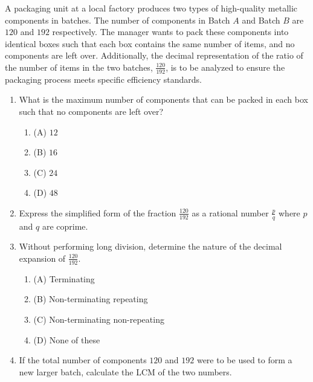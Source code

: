\documentclass[12pt,a4paper]{exam}
\begin{document}
\begin{questions}
\question[4] A packaging unit at a local factory produces two types of high-quality metallic components in batches. The number of components in Batch $A$ and Batch $B$ are $120$ and $192$ respectively. The manager wants to pack these components into identical boxes such that each box contains the same number of items, and no components are left over. Additionally, the decimal representation of the ratio of the number of items in the two batches, $\frac{120}{192}$, is to be analyzed to ensure the packaging process meets specific efficiency standards.
\vspace{0.2cm}
\begin{enumerate}[label=(\roman*)]
  \item What is the maximum number of components that can be packed in each box such that no components are left over?
  \begin{enumerate}[label=(\Alph*)]
    \item (A) $12$
    \item (B) $16$
    \item (C) $24$
    \item (D) $48$
  \end{enumerate}
  \item Express the simplified form of the fraction $\frac{120}{192}$ as a rational number $\frac{p}{q}$ where $p$ and $q$ are coprime.
  \item Without performing long division, determine the nature of the decimal expansion of $\frac{120}{192}$.
  \begin{enumerate}[label=(\Alph*)]
    \item (A) Terminating
    \item (B) Non-terminating repeating
    \item (C) Non-terminating non-repeating
    \item (D) None of these
  \end{enumerate}
  \item If the total number of components $120$ and $192$ were to be used to form a new larger batch, calculate the LCM of the two numbers.
\end{enumerate}
\vspace{0.15cm}


\end{questions}
\end{document}

